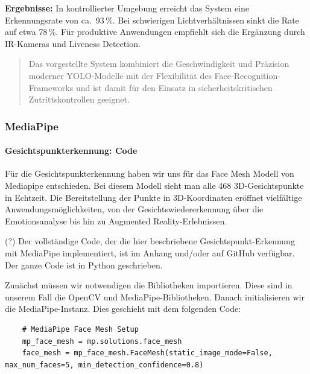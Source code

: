 \textbf{Ergebnisse:} In kontrollierter Umgebung erreicht das System eine Erkennungsrate von ca.~93\,\%. Bei schwierigen Lichtverhältnissen sinkt die Rate auf etwa 78\,\%. Für produktive Anwendungen empfiehlt sich die Ergänzung durch IR-Kameras und Liveness Detection.

\begin{quote}
Das vorgestellte System kombiniert die Geschwindigkeit und Präzision moderner YOLO-Modelle mit der Flexibilität des Face-Recognition-Frameworks und ist damit für den Einsatz in sicherheitskritischen Zutrittskontrollen geeignet.
\end{quote}

\subsubsection{MediaPipe}
\paragraph{Gesichtspunkterkennung: Code}
Für die Gesichtspunkterkennung haben wir uns für das Face Mesh Modell von Mediapipe entschieden. Bei diesem Modell sieht man alle 468 3D-Gesichtspunkte in Echtzeit. Die Bereitstellung der Punkte in 3D-Koordinaten eröffnet vielfältige Anwendungsmöglichkeiten, von der Gesichtswiedererkennung über die Emotionsanalyse bis hin zu Augmented Reality-Erlebnissen.

(?) Der vollständige Code, der die hier beschriebene Gesichtspunkt-Erkennung mit MediaPipe implementiert, ist im Anhang und/oder auf GitHub verfügbar.
Der ganze Code ist in Python geschrieben.

Zunächst müssen wir notwendigen die Bibliotheken importieren. Diese sind in unserem Fall die OpenCV und MediaPipe-Bibliotheken.
Danach initialisieren wir die MediaPipe-Instanz. Dies geschieht mit dem folgenden Code:
\begin{lstlisting}
    # MediaPipe Face Mesh Setup
    mp_face_mesh = mp.solutions.face_mesh
    face_mesh = mp_face_mesh.FaceMesh(static_image_mode=False, max_num_faces=5, min_detection_confidence=0.8)
\end{lstlisting}

